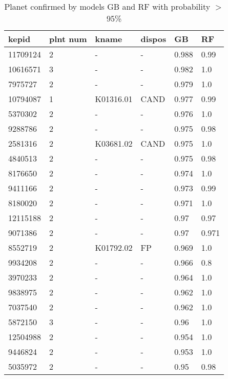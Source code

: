 \begin{table}[!htbp]
 \centering
 \caption{Planet confirmed by models GB and RF with probability $>$ 95\%}
 \label{dataGBRFcreftab} 
  \begin{tabular}
{| 
 p{}| 
 p{}| 
 p{}| 
 p{}| 
 p{}| 
 p{}| 
}\hline 
\textbf{kepid} &\textbf{plnt num} &\textbf{kname} &\textbf{dispos} &\textbf{GB} &\textbf{RF} \\ \hline 
11709124 &2 &- &- &0.988 &0.99 \\ \hline 
10616571 &3 &- &- &0.982 &1.0 \\ \hline 
7975727 &2 &- &- &0.979 &1.0 \\ \hline 
10794087 &1 &K01316.01 &CAND &0.977 &0.99 \\ \hline 
5370302 &2 &- &- &0.976 &1.0 \\ \hline 
9288786 &2 &- &- &0.975 &0.98 \\ \hline 
2581316 &2 &K03681.02 &CAND &0.975 &1.0 \\ \hline 
4840513 &2 &- &- &0.975 &0.98 \\ \hline 
8176650 &2 &- &- &0.974 &1.0 \\ \hline 
9411166 &2 &- &- &0.973 &0.99 \\ \hline 
8180020 &2 &- &- &0.971 &1.0 \\ \hline 
12115188 &2 &- &- &0.97 &0.97 \\ \hline 
9071386 &2 &- &- &0.97 &0.971 \\ \hline 
8552719 &2 &K01792.02 &FP &0.969 &1.0 \\ \hline 
9934208 &2 &- &- &0.966 &0.8 \\ \hline 
3970233 &2 &- &- &0.964 &1.0 \\ \hline 
9838975 &2 &- &- &0.962 &1.0 \\ \hline 
7037540 &2 &- &- &0.962 &1.0 \\ \hline 
5872150 &3 &- &- &0.96 &1.0 \\ \hline 
12504988 &2 &- &- &0.954 &1.0 \\ \hline 
9446824 &2 &- &- &0.953 &1.0 \\ \hline 
5035972 &2 &- &- &0.95 &0.98 \\ \hline 
\end{tabular} 
\end{table}